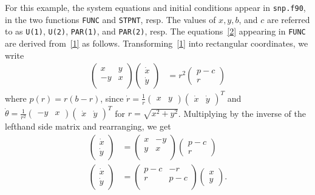 \documentclass[a4paper,11pt]{article}
\begin{document}
\noindent
For this example, the system equations and initial conditions appear in \texttt{snp.f90}, in the two functions \texttt{FUNC} and \texttt{STPNT}, resp. The values of $x,y,b$, and $c$ are referred to as \texttt{U(1)}, \texttt{U(2)}, \texttt{PAR(1)}, and \texttt{PAR(2)}, resp. The equations~\eqref{2} appearing in \texttt{FUNC} are derived from~\eqref{1} as follows. Transforming~\eqref{1} into rectangular coordinates, we write
\begin{align*}
\left(\begin{array}{cc}
x&y\\
-y&x\\
\end{array}\right)
\begin{pmatrix}\dot{x}\\\dot{y}\end{pmatrix}&=
r^2\begin{pmatrix}p-c\\r\end{pmatrix}
\end{align*}
where $p(r)=r(b-r)$, since $\dot{r}=\frac1r\begin{pmatrix}x&y\end{pmatrix}\begin{pmatrix}\dot{x}&\dot{y}\end{pmatrix}^T$ and $\dot{\theta}=\frac1{r^2}\begin{pmatrix}-y&x\end{pmatrix}\begin{pmatrix}\dot{x}&\dot{y}\end{pmatrix}^T$ for $r=\sqrt{x^2+y^2}$. Multiplying by the inverse of the lefthand side matrix and rearranging, we get
\begin{align}\label{2}
\begin{pmatrix}\dot{x}\\\dot{y}\end{pmatrix}&=
\left(\begin{array}{cc}
x&-y\\
y&x\\
\end{array}\right)\begin{pmatrix}p-c\\r\end{pmatrix}\nonumber\\
\begin{pmatrix}\dot{x}\\\dot{y}\end{pmatrix}&=\left(\begin{array}{cc}
p-c&-r\\
r&p-c\\
\end{array}\right)\begin{pmatrix}x\\y\end{pmatrix}.%
\end{align}
\end{document}
